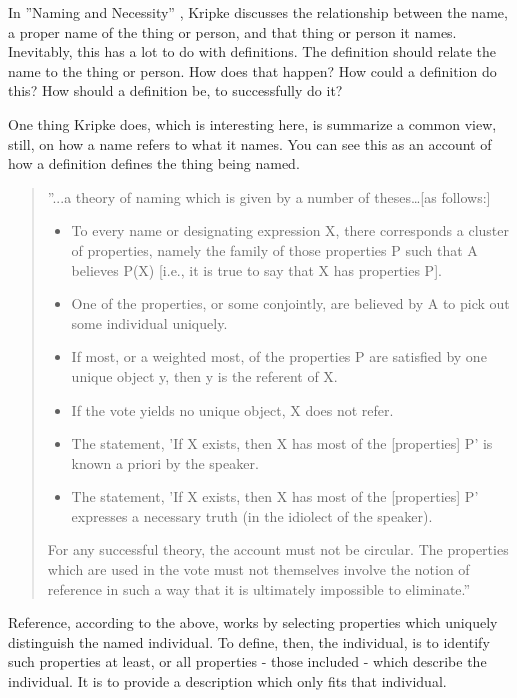 In ''Naming and Necessity'' \cite{kripke1972naming}, Kripke discusses the relationship between the name, a proper name of the thing or person, and that thing or person it names. Inevitably, this has a lot to do with definitions. The definition should relate the name to the thing or person. How does that happen? How could a definition do this? How should a definition be, to successfully do it?

One thing Kripke does, which is interesting here, is summarize a common view, still, on how a name refers to what it names. You can see this as an account of how a definition defines the thing being named.

\begin{quote}
''...a theory of naming which is given by a number of theses…[as follows:]
\begin{itemize}
\item To every name or designating expression X, there corresponds a cluster of properties, namely the family of those properties P such that A believes P(X) [i.e., it is true to say that X has properties P].
\item One of the properties, or some conjointly, are believed by A to pick out some individual uniquely.
\item If most, or a weighted most, of the properties P are satisfied by one unique object y, then y is the referent of X.
\item If the vote yields no unique object, X does not refer.
\item The statement, 'If X exists, then X has most of the [properties] P' is known a priori by the speaker.
\item The statement, 'If X exists, then X has most of the [properties] P' expresses a necessary truth (in the idiolect of the speaker).
\end{itemize}
For any successful theory, the account must not be circular. The properties which are used in the vote must not themselves involve the notion of reference in such a way that it is ultimately impossible to eliminate.'' \cite{kripke1972naming}
\end{quote}

Reference, according to the above, works by selecting properties which uniquely distinguish the named individual. To define, then, the individual, is to identify such properties at least, or all properties - those included - which describe the individual. It is to provide a description which only fits that individual.

